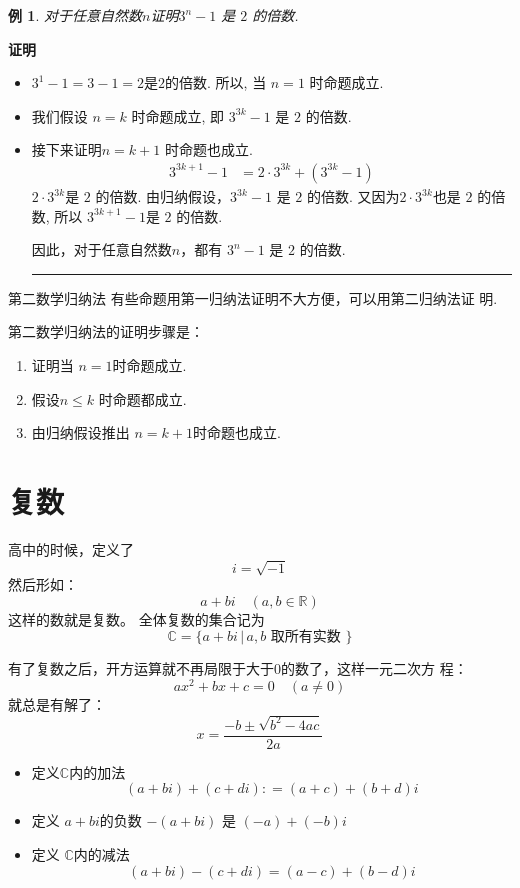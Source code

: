 \documentclass[13pt]{beamer}
\newtheorem{exa}{例}
\def\qed{\nopagebreak\hfill{\rule{4pt}{7pt}}\medbreak}
\def\pf{{\bf 证明~~ }}
\begin{document}
\begin{frame}
\begin{exa}
对于任意自然数$n$证明$3^n−1$ 是 $2$ 的倍数.
\end{exa}
\pf 

\begin{itemize}
	\item  $3^1−1 = 3−1 = 2$是$ 2 $的倍数.  所以, 当 $n=1$ 时命题成立. 
	\item 我们假设 $n=k$ 时命题成立, 即 $3^{3k}−1$ 是 $2$ 的倍数.
	\item 接下来证明$n=k+1$ 时命题也成立. 
	\begin{align*}
		3^{3k+1}-1 & = 2 \cdot 3^{3k}+(3^{3k}-1 )
	\end{align*}
	$2 \cdot 3^{3k}$是 $2$ 的倍数.
	由归纳假设，$3^{3k}−1$ 是 $2$ 的倍数.
	又因为$2 \cdot 3^{3k}$也是 $2$ 的倍数, 
	所以	$3^{3k+1}-1$是 $2$ 的倍数.
	
	因此，对于任意自然数$n$，都有 $3^n−1$ 是 $2$ 的倍数.
	 \qed
\end{itemize}
\end{frame}

\begin{frame}{第二数学归纳法}
有些命题用第一归纳法证明不大方便，可以用第二归纳法证
明. 

第二数学归纳法的证明步骤是：
\begin{enumerate}
\item 证明当 $n=1$时命题成立.
\item 假设$n\le k$ 时命题都成立.
\item 由归纳假设推出 $n=k+1$时命题也成立.
\end{enumerate}
\end{frame}

\section{复数}
\begin{frame}
高中的时候，定义了
\[
i=\sqrt{-1}
\]
然后形如：
\[
a+b i \quad(a, b \in \mathbb{R})
\]
这样的数就是复数。
全体复数的集合记为
\[
\mathbb{C}=\{a+b i \, | \, a, b \text { 取所有实数 }\}
\]


有了复数之后，开方运算就不再局限于大于0的数了，这样一元二次方 程：
\[
a x^{2}+b x+c=0 \quad(a \neq 0)
\]
就总是有解了：
\[
x=\frac{-b \pm \sqrt{b^{2}-4 a c}}{2 a}
\]


\end{frame}

\begin{frame}
\begin{itemize}
\item 定义$\mathbb{C}$内的加法
$$(a+b i)+(c+d i)  : =(a+c)+(b+d) i $$

\item 定义 $a+b {i}$的负数 $-(a+b {i})${ 是 } $(-a)+(-b) {i}$

\item 定义  $\mathbb{C}$内的减法 $$(a+b i)-(c+d i) =(a-c)+(b-d) i $$
\end{itemize}

\end{frame}
\end{document}
